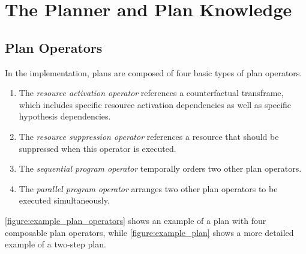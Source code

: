\chapter{The Planner and Plan Knowledge}
\label{chapter:the_planner_and_plan_knowledge}



\section{Plan Operators}

In the implementation, plans are composed of four basic types of plan
operators.
\begin{enumerate}
\item The \emph{resource activation operator} references a
  counterfactual transframe, which includes specific resource
  activation dependencies as well as specific hypothesis dependencies.
\item The \emph{resource suppression operator} references a resource
  that should be suppressed when this operator is executed.
\item The \emph{sequential program operator} temporally orders two
  other plan operators.
\item The \emph{parallel program operator} arranges two other plan
  operators to be executed simultaneously.
\end{enumerate}
{\mbox{\autoref{figure:example_plan_operators}}} shows an example of a
plan with four composable plan operators, while
{\mbox{\autoref{figure:example_plan}}} shows a more detailed example
of a two-step plan.

